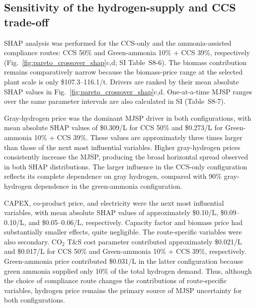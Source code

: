 \subsection{Sensitivity of the hydrogen-supply and CCS trade-off}
\label{sec:sensitivity_tradeoff}


SHAP analysis was performed for the CCS-only and the ammonia-assisted compliance routes: CCS 50\% and Green-ammonia 10\% + CCS 39\%, respectively (Fig.~\ref{fig:pareto_crossover_shap}c,d; SI Table~S8-6). The biomass contribution remains comparatively narrow because the biomass-price range at the selected plant scale is only \$107.3--116.1/t. 
Drivers are ranked by their mean absolute SHAP values in Fig.~\ref{fig:pareto_crossover_shap}c,d. One-at-a-time MJSP ranges over the same parameter intervals are also calculated in SI (Table~S8-7).

Gray-hydrogen price was the dominant MJSP driver in both configurations, with mean absolute SHAP values of \$0.309/L for CCS 50\% and \$0.273/L for Green-ammonia 10\% + CCS 39\%. These values are approximately three times larger than those of the next most influential variables. Higher gray-hydrogen prices consistently increase the MJSP, producing the broad horizontal spread observed in both SHAP distributions. The larger influence in the CCS-only configuration reflects its complete dependence on gray hydrogen, compared with 90\% gray-hydrogen dependence in the green-ammonia configuration.

CAPEX, co-product price, and electricity were the next most influential variables, with mean absolute SHAP values of approximately \$0.10/L, \$0.09--0.10/L, and \$0.05--0.06/L, respectively. Capacity factor and biomass price had substantially smaller effects, quite negligible. The route-specific variables were also secondary. CO$_2$ T\&S cost parameter contributed approximately \$0.021/L and \$0.017/L for CCS 50\% and Green-ammonia 10\% + CCS 39\%, respectively. Green-ammonia price contributed \$0.031/L in the latter configuration because green ammonia supplied only 10\% of the total hydrogen demand. Thus, although the choice of compliance route changes the contributions of route-specific variables, hydrogen price remains the primary source of MJSP uncertainty for both configurations.


